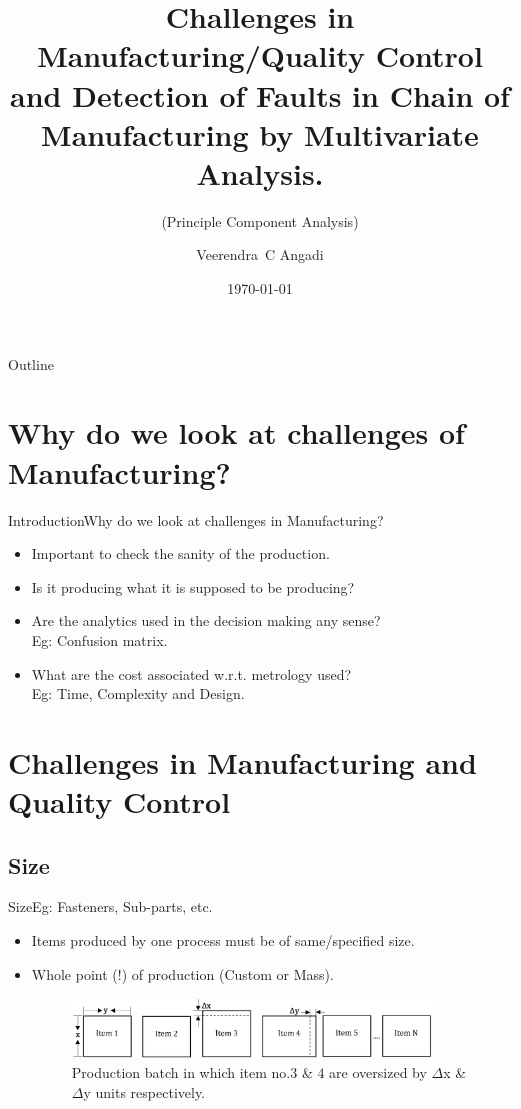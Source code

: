 \documentclass{beamer}
\title[Challenges in Mnfg/QC and Faults Detection using PCA]{Challenges in Manufacturing/Quality Control and Detection of Faults in Chain of Manufacturing by Multivariate Analysis.}
\subtitle{(Principle Component Analysis)}
\author{Veerendra~C Angadi}
\institute[University of Sheffield] %
{
  Department of Electronic and Electrical Engineering,\\
  George Porter Building, Red Hill - Broad Lane,\\
  University of Sheffield - S3 7HQ
}
\date{\today}
\begin{document}
\begin{frame}
  \titlepage
\end{frame}

\begin{frame}{Outline}
  \tableofcontents
\end{frame}

\section{Why do we look at challenges of Manufacturing?}


\begin{frame}{Introduction}{Why do we look at challenges in Manufacturing?}
  \begin{itemize}
    \item Important to check the sanity of the production.
    \item Is it producing what it is supposed to be producing?
    \item Are the analytics used in the decision making any sense? \\ Eg: Confusion matrix.
    \item What are the cost associated w.r.t. metrology used? \\ Eg: Time, Complexity and Design.
  \end{itemize}
\end{frame}

\section{Challenges in Manufacturing and Quality Control}

\subsection{Size}

\begin{frame}{Size}{Eg: Fasteners, Sub-parts, etc.}
  \begin{itemize}
  \item { Items produced by one process must be of same/specified size.
        \pause }
  \item Whole point (!) of production (Custom or Mass).

  \begin{figure}
    \includegraphics[width=0.9\textwidth]{size}
    \caption{Production batch in which item no.$3$ \& $4$ are oversized by $\Delta$x \& $\Delta$y units respectively.}
    \label{fig:size_line}
  \end{figure}

  \end{itemize}
\end{frame}
\end{document}
